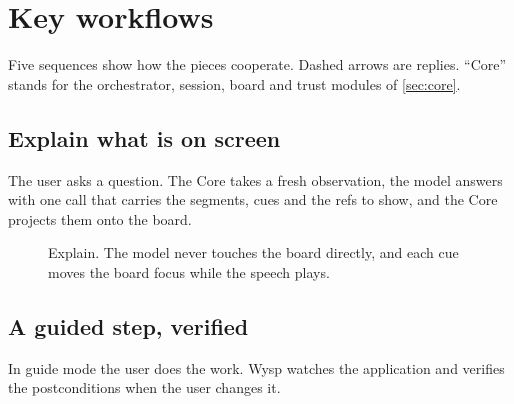 ﻿\section{Key workflows}\label{sec:workflows}

Five sequences show how the pieces cooperate. Dashed arrows are replies. ``Core'' stands for the orchestrator, session, board and trust modules of \cref{sec:core}.

\subsection{Explain what is on screen}

The user asks a question. The Core takes a fresh observation, the model answers with one  call that carries the segments, cues and the refs to show, and the Core projects them onto the board.

\begin{figure}[H]
\centering
{}
\caption{Explain. The model never touches the board directly, and each cue moves the board focus while the speech plays.}\label{fig:wf-explain}
\end{figure}

\subsection{A guided step, verified}

In guide mode the user does the work. Wysp watches the application and verifies the postconditions when the user changes it.

